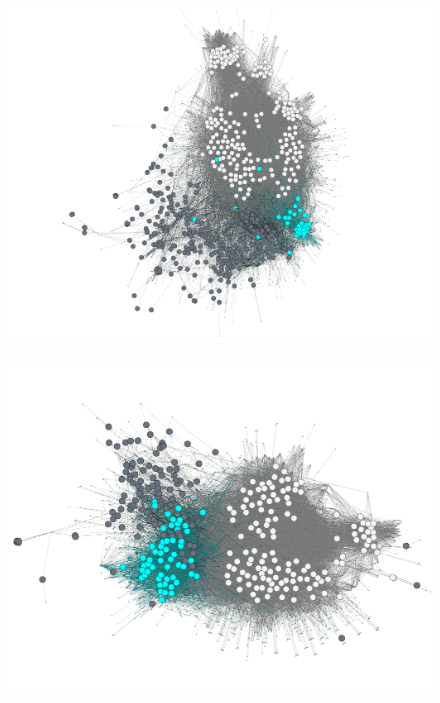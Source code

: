 \begin{landscape}
\begin{figure}
\begin{center}
\begin{minipage}[t]{0.40\textwidth}
\includegraphics[width=\textwidth]{./img/alpha.png}
\label{figalpha}
\end{minipage}
\begin{minipage}[t]{0.40\textwidth}
\includegraphics[width=\textwidth]{./img/beta.png}
\label{figbeta}
\end{minipage}
\begin{minipage}[t]{0.40\textwidth}

\end{minipage}
\end{center}
\end{figure}
\end{landscape}
